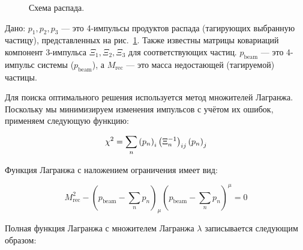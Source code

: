\label{fit_rec_mass}
\begin{figure}[h!]
    \centering
    \caption{Схема распада.}
    \label{fit_tag}
\end{figure}

Дано: $p_1, p_2, p_3$ --- это 4-импульсы продуктов распада (тагирующих выбранную частицу), представленных на рис.~\ref{fit_tag}. 
Также известны матрицы ковариаций компонент 3-импульса $\Xi_1, \Xi_2, \Xi_3$ для соответствующих частиц. 
$p_{\text{beam}}$ — это 4-импульс системы ($p_{\text{beam}}$), а $M_{\text{rec}}$ --- это масса недостающей (тагируемой) частицы.

Для поиска оптимального решения используется метод множителей Лагранжа. Поскольку мы минимизируем изменения импульсов с учётом их ошибок, применяем следующую функцию:

\begin{equation}
    \chi^2 = \sum_n \left( p_{n} \right)_i  \left( \Xi_n^{-1} \right)_{ij}  \left( p_{n} \right)_j
\end{equation}

Функция Лагранжа с наложением ограничения имеет вид:

\begin{equation}
    M_{\text{rec}}^2 - (p_{\text{beam}} - \sum_n p_n)_\mu (p_{\text{beam}} - \sum_n p_n)^\mu = 0
\end{equation}

Полная функция Лагранжа с множителем Лагранжа $\lambda$ записывается следующим образом:

